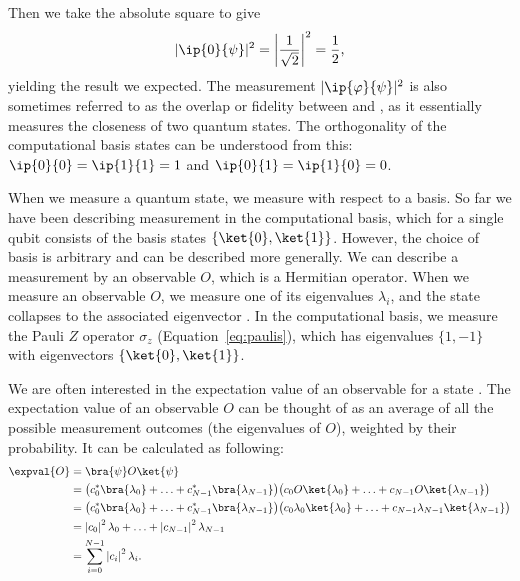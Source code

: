 \documentclass[a4paper,10pt]{article}
\begin{document}
Then we take the absolute square to give
\begin{equation}
\lvert \ip{0}{\psi} \rvert^2 = \left\lvert \dfrac{1}{\sqrt2} \right\rvert^2 = \dfrac{1}{2},
\end{equation}
yielding the result we expected.
The measurement $\lvert\ip{\varphi}{\psi}\rvert^2$ is also sometimes referred to as the overlap or fidelity between \ket{\psi} and \ket{\varphi}, as it essentially measures the closeness of two quantum states.
The orthogonality of the computational basis states can be understood from this: $\ip{0}{0} = \ip{1}{1} = 1$ and $\ip{0}{1} = \ip{1}{0} = 0$.

When we measure a quantum state, we measure with respect to a basis.
So far we have been describing measurement in the computational basis, which for a single qubit consists of the basis states $\{\ket{0}, \ket{1}\}$.
However, the choice of basis is arbitrary and can be described more generally.
We can describe a measurement by an observable $O$, which is a Hermitian operator.
When we measure an observable $O$, we measure one of its eigenvalues $\lambda_i$, and the state collapses to the associated eigenvector .
In the computational basis, we measure the Pauli $Z$ operator $\sigma_z$ (Equation~\ref{eq:paulis}), which has eigenvalues $\{1, -1\}$ with eigenvectors $\{\ket{0}, \ket{1}\}$.

We are often interested in the expectation value of an observable for a state \ket{\psi}.
The expectation value  of an observable $O$ can be thought of as an average of all the possible measurement outcomes (the eigenvalues of $O$), weighted by their probability.
It can be calculated as following:
\begin{equation}
\begin{aligned}
\expval{O} &= \bra{\psi}O\ket{\psi} \\
&= \big(c_0^*\bra{\lambda_0} + \ldots + c_{N-1}^*\bra{\lambda_{N-1}}\big) \big(c_0O\ket{\lambda_0} + \ldots + c_{N-1}O\ket{\lambda_{N-1}}\big) \\
&= \big(c_0^*\bra{\lambda_0} + \ldots + c_{N-1}^*\bra{\lambda_{N-1}}\big) \big(c_0\lambda_0\ket{\lambda_0} + \ldots + c_{N-1}\lambda_{N-1}\ket{\lambda_{N-1}}\big) \\
&=  \left\lvert c_0\right\rvert^2\lambda_0 + \ldots + \left\lvert c_{N-1}\right\rvert^2 \lambda_{N-1} \\
&= \sum_{i=0}^{N-1} \left\lvert c_i\right\rvert^2\lambda_i.
\end{aligned}
\end{equation}
\end{document}
